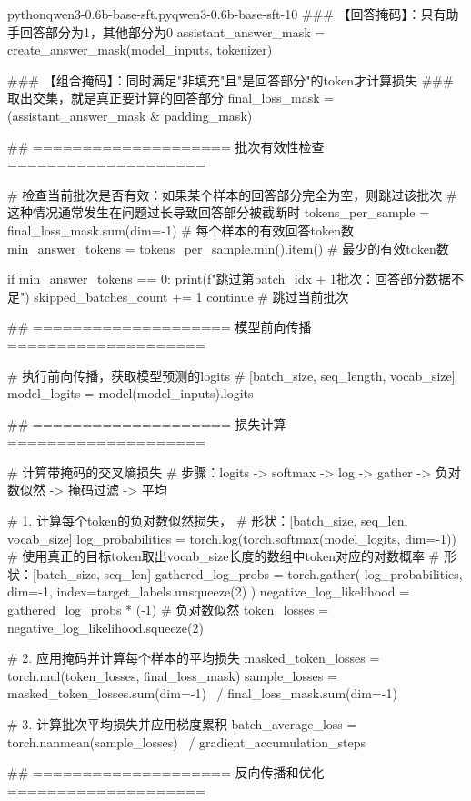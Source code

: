 \documentclass[lang=cn,newtx,10pt,scheme=chinese]{elegantbook}
\begin{document}
\begin{codebox}{python}{qwen3-0.6b-base-sft.py}{qwen3-0.6b-base-sft-10}
    ### 【回答掩码】：只有助手回答部分为1，其他部分为0
    assistant_answer_mask = create_answer_mask(model_inputs, tokenizer)
    
    ### 【组合掩码】：同时满足"非填充"且"是回答部分"的token才计算损失
    ### 取出交集，就是真正要计算的回答部分
    final_loss_mask = (assistant_answer_mask & padding_mask)

    ## ==================== 批次有效性检查 ====================
    
    # 检查当前批次是否有效：如果某个样本的回答部分完全为空，则跳过该批次
    # 这种情况通常发生在问题过长导致回答部分被截断时
    tokens_per_sample = final_loss_mask.sum(dim=-1)  # 每个样本的有效回答token数
    min_answer_tokens = tokens_per_sample.min().item()  # 最少的有效token数
    
    if min_answer_tokens == 0:
        print(f"跳过第{batch_idx + 1}批次：回答部分数据不足")
        skipped_batches_count += 1
        continue  # 跳过当前批次

    ## ==================== 模型前向传播 ====================
    
    # 执行前向传播，获取模型预测的logits
    # [batch_size, seq_length, vocab_size]
    model_logits = model(model_inputs).logits
    
    ## ==================== 损失计算 ====================
    
    # 计算带掩码的交叉熵损失
    # 步骤：logits -> softmax -> log -> gather -> 负对数似然 -> 掩码过滤 -> 平均
    
    # 1. 计算每个token的负对数似然损失，
    # 形状：[batch_size, seq_len, vocab_size]
    log_probabilities = torch.log(torch.softmax(model_logits, dim=-1))
    # 使用真正的目标token取出vocab_size长度的数组中token对应的对数概率
    # 形状：[batch_size, seq_len]
    gathered_log_probs = torch.gather(
        log_probabilities,
        dim=-1,
        index=target_labels.unsqueeze(2)
    )
    negative_log_likelihood = gathered_log_probs * (-1)  # 负对数似然
    token_losses = negative_log_likelihood.squeeze(2)
    
    # 2. 应用掩码并计算每个样本的平均损失
    masked_token_losses = torch.mul(token_losses, final_loss_mask)
    sample_losses = masked_token_losses.sum(dim=-1) \
                  / final_loss_mask.sum(dim=-1)
    
    # 3. 计算批次平均损失并应用梯度累积
    batch_average_loss = torch.nanmean(sample_losses) \
                       / gradient_accumulation_steps

    ## ==================== 反向传播和优化 ====================
    

\end{codebox}
\end{document}
